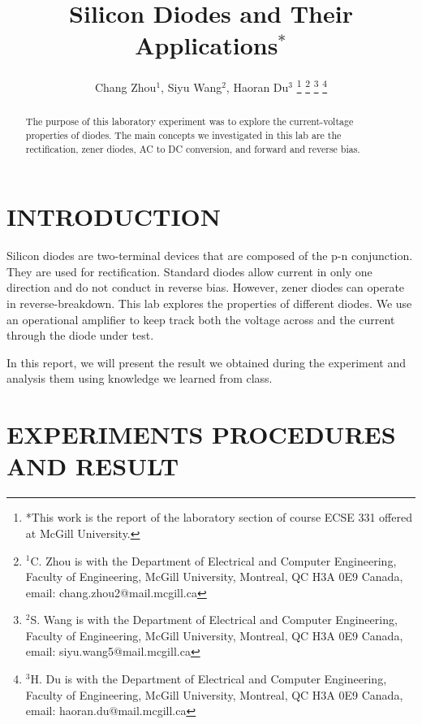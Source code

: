 \documentclass[letterpaper, 10 pt, conference]{ieeeconf}  %
\title{\large \bf Silicon Diodes and Their Applications$^{*}$}
\author{Chang Zhou$^{1}$, Siyu Wang$^{2}$, Haoran Du$^{3}$%
\thanks{*This work is the report of the laboratory section of course ECSE 331 offered at McGill University.}%
\thanks{$^{1}$C. Zhou is with the Department of Electrical and Computer
Engineering, Faculty of Engineering, McGill University, Montreal, QC H3A 0E9 Canada,
email: chang.zhou2@mail.mcgill.ca}%
\thanks{$^{2}$S. Wang is with the Department of Electrical and Computer
Engineering, Faculty of Engineering, McGill University, Montreal, QC H3A 0E9 Canada,
email: siyu.wang5@mail.mcgill.ca}%
\thanks{$^{3}$H. Du is with the Department of Electrical and Computer
Engineering, Faculty of Engineering, McGill University, Montreal, QC H3A 0E9 Canada,
email: haoran.du@mail.mcgill.ca}%
}
\begin{document}

\maketitle
\thispagestyle{fancy}
\pagestyle{fancy}
\setcounter{page}{1}
\fancyhf{} %
\renewcommand{\headrulewidth}{0pt} %
\rhead{\thepage}

\begin{abstract}
  The purpose of this laboratory experiment was to explore the current-voltage properties of diodes. The main concepts we investigated in this lab are the rectification, zener diodes, AC to DC conversion, and forward and reverse bias.
\end{abstract}

\section{INTRODUCTION}
Silicon diodes are two-terminal devices that are composed of the p-n conjunction. They are used for rectification. Standard diodes allow current in only one direction and do not conduct in reverse bias. However, zener diodes can operate in reverse-breakdown. This lab explores the properties of different diodes. We use an operational amplifier to keep track both the voltage across and the current through the diode under test.
\par In this report, we will present the result we obtained during the experiment and analysis them using knowledge we learned from class.
\section{EXPERIMENTS PROCEDURES AND RESULT}
\end{document}
